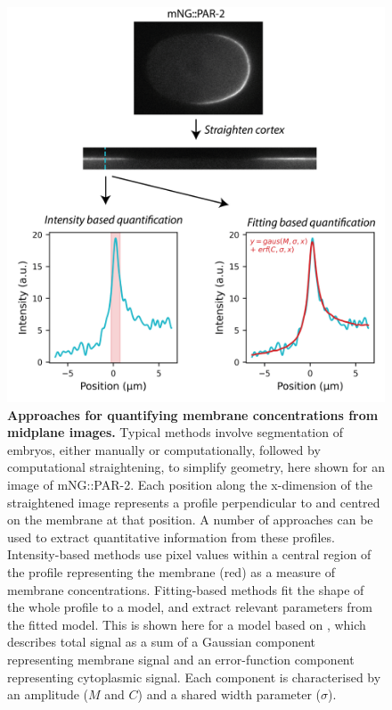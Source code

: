 \documentclass[12pt]{"report"}
\newcommand{\mycaption}[2]{\caption[#1]{\textbf{#1.} #2}}
\begin{document}
\begin{figure}
\includegraphics[scale=1]{memquant_method_comparison}
\centering
\mycaption{Approaches for quantifying membrane concentrations from midplane images}{Typical methods involve segmentation of embryos, either manually or computationally, followed by computational straightening, to simplify geometry, here shown for an image of mNG::PAR-2. Each position along the x-dimension of the straightened image represents a profile perpendicular to and centred on the membrane at that position. A number of approaches can be used to extract quantitative information from these profiles. Intensity-based methods use pixel values within a central region of the profile representing the membrane (red) as a measure of membrane concentrations. Fitting-based methods fit the shape of the whole profile to a model, and extract relevant parameters from the fitted model. This is shown here for a model based on \textcite{Gross2018}, which describes total signal as a sum of a Gaussian component representing membrane signal and an error-function component representing cytoplasmic signal. Each component is characterised by an amplitude ($M$ and $C$) and a shared width parameter ($\sigma$).
}
\label{fig:memquant_method_comparison}
\end{figure}
\end{document}
